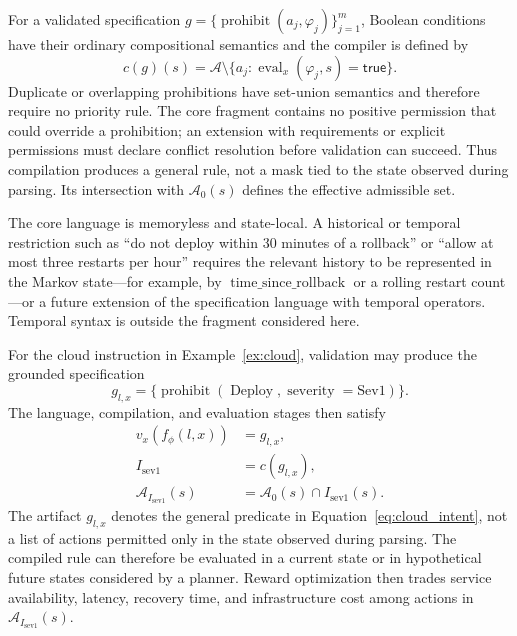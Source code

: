 \documentclass[journal]{IEEEtran}
\theoremstyle{definition}
\newcommand{\cA}{\mathcal{A}}
\begin{document}
For a validated specification
$g=\{\operatorname{prohibit}(a_j,\varphi_j)\}_{j=1}^m$, Boolean conditions have
their ordinary compositional semantics and the compiler is defined by
\begin{equation}
  c(g)(s)
  = \cA\setminus
    \{a_j:\operatorname{eval}_x(\varphi_j,s)=\mathsf{true}\}.
  \label{eq:compiler_semantics}
\end{equation}
Duplicate or overlapping prohibitions have set-union semantics and therefore
require no priority rule. The core fragment contains no positive permission
that could override a prohibition; an extension with requirements or explicit
permissions must declare conflict resolution before validation can succeed.
Thus compilation produces a general rule, not a mask tied to the state observed
during parsing. Its intersection with $\cA_0(s)$ defines the effective
admissible set.

The core language is memoryless and state-local. A historical or temporal
restriction such as ``do not deploy within 30 minutes of a rollback'' or
``allow at most three restarts per hour'' requires the relevant history to be
represented in the Markov state---for example, by
$\operatorname{time\_since\_rollback}$ or a rolling restart count---or a future
extension of the specification language with temporal operators. Temporal
syntax is outside the fragment considered here.

For the cloud instruction in Example~\ref{ex:cloud}, validation may produce
the grounded specification
\[
 g_{l,x}=\{\operatorname{prohibit}(\operatorname{Deploy},
   \operatorname{severity}=\mathrm{Sev1})\}.
\]
The language, compilation, and evaluation stages then satisfy
\begin{equation}
\begin{aligned}
 v_x(f_\phi(l,x)) &=g_{l,x}, \\
 I_{\mathrm{sev1}} &=c(g_{l,x}), \\
 \cA_{I_{\mathrm{sev1}}}(s) &=\cA_0(s)\cap I_{\mathrm{sev1}}(s).
\end{aligned}
 \label{eq:cloud_compiler}
\end{equation}
The artifact $g_{l,x}$ denotes the general predicate in
Equation~\eqref{eq:cloud_intent}, not a list of actions permitted only in the
state observed during parsing. The compiled rule can therefore be evaluated
in a current state or in hypothetical future states considered by a
planner. Reward optimization then trades service availability, latency,
recovery time, and infrastructure cost among actions in
$\cA_{I_{\mathrm{sev1}}}(s)$.
\end{document}
